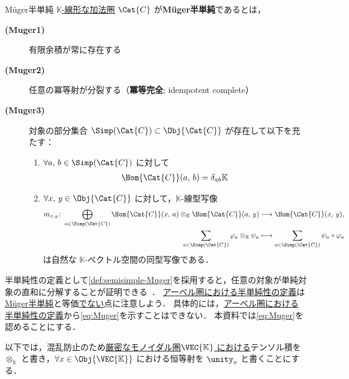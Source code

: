 \documentclass[TQFT_main]{subfiles}
\begin{document}
\begin{mydef}[label=def:semisimple-Muger,breakable]{M\"{u}ger半単純}
    \hyperref[def:additive-cat]{$\mathbb{K}$-線形な加法圏} $\Cat{C}$ が\textbf{M\"{u}ger半単純}であるとは，
    \begin{description}
        \item[\textbf{(Muger1)}] 有限余積が常に存在する
        \item[\textbf{(Muger2)}] 任意の冪等射が分裂する（\textbf{冪等完全}; idempotent complete）
        \item[\textbf{(Muger3)}] 対象の部分集合 $\Simp(\Cat{C}) \subset \Obj{\Cat{C}}$ が存在して以下を充たす：
        \begin{enumerate}
            \item $\forall a,\, b \in \Simp(\Cat{C})$ に対して
            \begin{align}
                \Hom{\Cat{C}}(a,\, b) = \delta_{ab}\mathbb{K}
            \end{align}
            \item $\forall x,\, y \in \Obj{\Cat{C}}$ に対して，$\mathbb{K}$-線型写像
            \begin{align}
                \label{eq:Muger}
                m_{x,y} \colon \bigoplus_{a \in \Simp(\Cat{C})}\Hom{\Cat{C}} (x,\, a) \otimes_{\mathbb{K}} \Hom{\Cat{C}} (a,\, y) &\lto \Hom{\Cat{C}} (x,\, y), \\
                \sum_{a \in \Simp(\Cat{C})} \varphi_a \otimes_{\mathbb{K}} \psi_a &\lmto \sum_{a \in \Simp(\Cat{C})} \psi_a \circ \varphi_a
            \end{align}
            は自然な $\mathbb{K}$-ベクトル空間の同型写像である．
        \end{enumerate}
    \end{description}
\end{mydef}

半単純性の定義として\ref{def:semisimple-Muger}を採用すると，任意の対象が単純対象の直和に分解することが証明できる~\cite[Proposition 28, p.7]{James2017semisimple}．
\hyperref[def:semisimple-cat]{アーベル圏における半単純性の定義}は\hyperref[def:semisimple-Muger]{M\"{u}ger半単純}と等価\underline{でない}点に注意しよう．
具体的には，\hyperref[def:semisimple-cat]{アーベル圏における半単純性の定義}から\eqref{eq:Muger}を示すことはできない．
本資料では\eqref{eq:Muger}を認めることにする．

\begin{marker}
    以下では，混乱防止のため\hyperref[redef:monoidal-category]{厳密なモノイダル圏}\underline{$\VEC{\mathbb{K}}$ における}テンソル積を $\otimes_{\mathbb{K}}$ と書き，$\forall x \in \Obj{\VEC{\mathbb{K}}}$ における恒等射を $\unity_x$ と書くことにする．
\end{marker}
\end{document}
